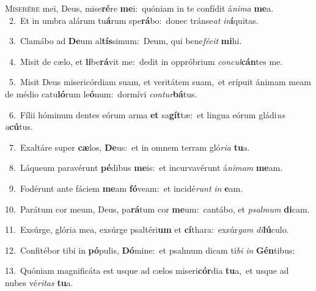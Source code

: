\lettrine{\initial\textcolor{\initialcolor}{M}}{iserére} mei, Deus, mise\-\textbf{ré}\-re \textbf{me}\-i:~\star quóniam in te confídit á\-\textit{ni}\-\textit{ma} \textbf{me}\-a.\\
{\numbfont\textcolor{\numbcolor}{~2.}}~Et in umbra alárum tu\-\textbf{á}\-rum spe\-\textbf{rá}\-bo:~\star donec tránse\textit{at} \textit{in}\-\textbf{í}quitas.\par
{\numbfont\textcolor{\numbcolor}{~3.}}~Clamábo ad \textbf{De}\-um al\-\textbf{tís}\-simum:~\star Deum, qui bene\-\textit{fé}\-\textit{cit} \textbf{mi}\-hi.\par
{\numbfont\textcolor{\numbcolor}{~4.}}~Misit de cælo, et \textbf{li}\-be\-\textbf{rá}\-vit me:~\star dedit in oppróbrium \textit{con}\-\textit{cul}\textbf{cán}tes me.\par
{\numbfont\textcolor{\numbcolor}{~5.}}~Misit Deus misericórdiam suam, et veritátem suam,~\dagger et erípuit ánimam meam de médio catu\-\textbf{ló}\-rum le\-\textbf{ó}\-num:~\star dormívi \textit{con}\-\textit{tur}\textbf{bá}tus.\par
{\numbfont\textcolor{\numbcolor}{~6.}}~Fílii hóminum dentes eórum arma \textbf{et} sa\-\textbf{gít}\-tæ:~\star et lingua eórum gládi\textit{us} \textit{a}\-\textbf{cú}tus.\par
{\numbfont\textcolor{\numbcolor}{~7.}}~Exaltáre super \textbf{cæ}\-los, \textbf{De}\-us:~\star et in omnem terram gló\-\textit{ri}\-\textit{a} \textbf{tu}\-a.\par
{\numbfont\textcolor{\numbcolor}{~8.}}~Láqueum paravérunt \textbf{pé}\-dibus \textbf{me}\-is:~\star et incurvavérunt á\-\textit{ni}\-\textit{mam} \textbf{me}\-am.\par
{\numbfont\textcolor{\numbcolor}{~9.}}~Fodérunt ante fáciem \textbf{me}\-am \textbf{fó}\-veam:~\star et incidé\textit{runt} \textit{in} \textbf{e}\-am.\par
{\numbfont\textcolor{\numbcolor}{10.}}~Parátum cor meum, Deus, pa\-\textbf{rá}\-tum cor \textbf{me}\-um:~\star cantábo, et \textit{psal}\-\textit{mum} \textbf{di}\-cam.\par
{\numbfont\textcolor{\numbcolor}{11.}}~Exsúrge, glória mea, exsúrge psaltéri\textbf{um} et \textbf{cí}\-thara:~\star exsúr\textit{gam} \textit{di}\-\textbf{lú}culo.\par
{\numbfont\textcolor{\numbcolor}{12.}}~Confitébor tibi in \textbf{pó}\-pulis, \textbf{Dó}\-mine:~\star et psalmum dicam ti\textit{bi} \textit{in} \textbf{Gén}\-tibus:\par
{\numbfont\textcolor{\numbcolor}{13.}}~Quóniam magnificáta est usque ad cælos miseri\-\textbf{cór}\-dia \textbf{tu}\-a,~\star et usque ad nubes vé\-\textit{ri}\-\textit{tas} \textbf{tu}\-a.\par
